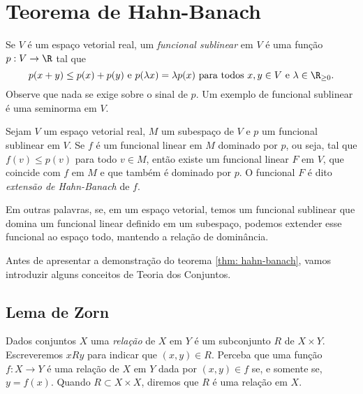 \section{Teorema de Hahn-Banach}

Se \( V \) é um espaço vetorial real, um \emph{funcional sublinear} em \( V \) é uma função \( p : V \to \R \) tal que
\begin{equation}
    p ( x + y ) \leq p(x) + p(y) \text{ e } p(\lambda x) = \lambda p(x) \text{ para todos \( x, y \in V \) e \( \lambda \in \R_{ \geq 0 } \)}
.\end{equation}
Observe que nada se exige sobre o sinal de \( p \).
Um exemplo de funcional sublinear é uma seminorma em \( V \).

\begin{teo}
    \label{thm: hahn-banach}
    Sejam \( V \) um espaço vetorial real, \( M \) um subespaço de \( V \) e \( p \) um funcional sublinear em \( V \).
    Se \( f \) é um funcional linear em \( M \) dominado por \( p \), ou seja, tal que \( f(v) \leq p(v) \) para todo \( v \in M \), então existe um funcional linear \( F \) em \( V \), que coincide com \( f \) em \( M \) e que também é dominado por \( p \).
    O funcional \( F \) é dito \emph{extensão de Hahn-Banach} de \( f \).
\end{teo}

Em outras palavras, se, em um espaço vetorial, temos um funcional sublinear que domina um funcional linear definido em um subespaço, podemos extender esse funcional ao espaço todo, mantendo a relação de dominância.

Antes de apresentar a demonstração do teorema \ref{thm: hahn-banach}, vamos introduzir alguns conceitos de Teoria dos Conjuntos.


\subsection{Lema de Zorn}

Dados conjuntos \( X \) uma \emph{relação} de \( X \) em \( Y \) é um subconjunto \( R \) de \( X \times Y \). 
Escreveremos \( x R y \) para indicar que \( ( x, y ) \in R \).
Perceba que uma função \( f : X \to Y \) é uma relação de \( X \) em \( Y \) dada por \( ( x, y ) \in f \) se, e somente se, \( y = f(x) \).
Quando \( R \subset X \times X \), diremos que \( R \) é uma relação em \( X \).

